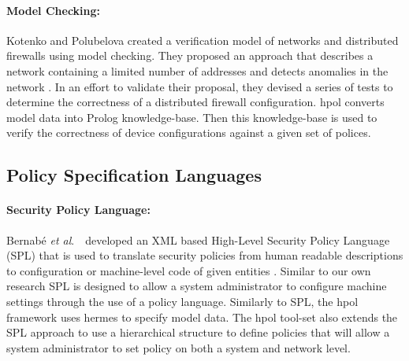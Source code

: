 \documentclass[12pt,letterpaper]{report}
\newcommand{\etal}{\textit{et al}.\ }
\begin{document}
\paragraph{Model Checking:}Kotenko and Polubelova created a verification model of networks and distributed firewalls using model checking. They proposed an approach that describes a network containing a limited number of addresses and detects anomalies in the network \cite{kotenko2011verification}. In an effort to validate their proposal, they devised a series of tests to determine the correctness of a distributed firewall configuration. \ac{hpol} converts model data into Prolog knowledge-base. Then this knowledge-base is used to verify the correctness of device configurations against a given set of polices.

\subsection{Policy Specification Languages}

\paragraph{Security Policy Language:}Bernab{\'e} \etal\ developed an XML based High-Level Security Policy Language (SPL) that is used to translate security policies from human readable descriptions to configuration or machine-level code of given entities \cite{re2012security}. Similar to our own research SPL is designed to allow a system administrator to configure machine settings through the use of a policy language. Similarly to SPL, the \ac{hpol} framework uses \ac{hermes} to specify model data. The \ac{hpol} tool-set also extends the SPL approach to use a hierarchical structure to define policies that will allow a system administrator to set policy on both a system and network level. 

\end{document}

